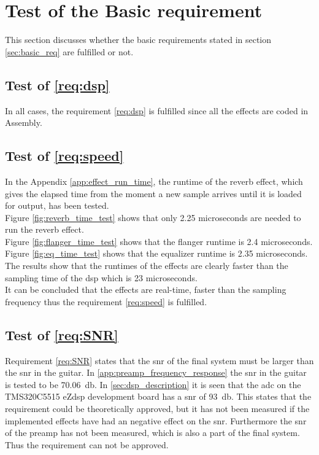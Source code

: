 \section{Test of the Basic requirement}
This section discusses whether the basic requirements stated in section \ref{sec:basic_req} are fulfilled or not. 

\subsection{Test of  \autoref{req:dsp}}
In all cases, the requirement \ref{req:dsp} is fulfilled since all the effects are coded in Assembly.


\subsection{Test of  \autoref{req:speed}}
In the Appendix \ref{app:effect_run_time}, the runtime of the reverb effect, which gives the elapsed time from the moment a new sample arrives until it is loaded for output, has been tested. \\
Figure \ref{fig:reverb_time_test} shows that only 2.25 microseconds are needed to run the \gls{reverb} effect. \\
Figure \ref{fig:flanger_time_test} shows that the flanger runtime is 2.4 microseconds. \\
Figure \ref{fig:eq_time_test} shows that the equalizer runtime is 2.35 microseconds. \\
The results show that the runtimes of the effects are clearly faster than the sampling time of the \gls{dsp} which is 23 microseconds. \\
It can be concluded that the effects are real-time, faster than the sampling frequency thus the requirement \ref{req:speed} is fulfilled. \\

\subsection{Test of \autoref{req:SNR}}
Requirement \autoref{req:SNR} states that the \gls{snr} of the final system must be larger than the \gls{snr} in the guitar. In \autoref{app:preamp_frequency_response} the \gls{snr} in the guitar is tested to be \SI{70.06}{\decibel}. In \autoref{sec:dsp_description} it is seen that the \gls{adc} on the TMS320C5515 eZdsp development board has a \gls{snr} of \SI{93}{\decibel}. This states that the requirement could be theoretically approved, but it has not been measured if the implemented effects have had an negative effect on the \gls{snr}. Furthermore the \gls{snr} of the \gls{preamp} has not been measured, which is also a part of the final system. Thus the requirement can not be approved. 

